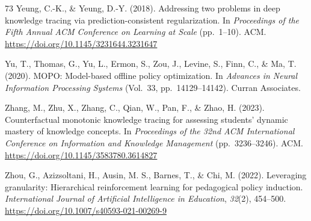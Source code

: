 \documentclass[a4paper,preprint,12pt,authoryear]{elsarticle}
\begin{document}
\begin{thebibliography}{73}
Yeung, C.-K., \& Yeung, D.-Y. (2018). Addressing two problems in deep knowledge tracing via prediction-consistent regularization. In \textit{Proceedings of the Fifth Annual ACM Conference on Learning at Scale} (pp.~1--10). ACM. \url{https://doi.org/10.1145/3231644.3231647}

Yu, T., Thomas, G., Yu, L., Ermon, S., Zou, J., Levine, S., Finn, C., \& Ma, T. (2020). MOPO: Model-based offline policy optimization. In \textit{Advances in Neural Information Processing Systems} (Vol.~33, pp.~14129--14142). Curran Associates.

Zhang, M., Zhu, X., Zhang, C., Qian, W., Pan, F., \& Zhao, H. (2023). Counterfactual monotonic knowledge tracing for assessing students' dynamic mastery of knowledge concepts. In \textit{Proceedings of the 32nd ACM International Conference on Information and Knowledge Management} (pp.~3236--3246). ACM. \url{https://doi.org/10.1145/3583780.3614827}

Zhou, G., Azizsoltani, H., Ausin, M. S., Barnes, T., \& Chi, M. (2022). Leveraging granularity: Hierarchical reinforcement learning for pedagogical policy induction. \textit{International Journal of Artificial Intelligence in Education}, \textit{32}(2), 454--500. \url{https://doi.org/10.1007/s40593-021-00269-9}

\end{thebibliography}
\end{document}
